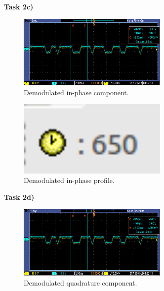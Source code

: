 \documentclass{article}
\begin{document}
\pagebreak
\textbf{Task 2c)}

\begin{figure}[h]
  \begin{center}
    \includegraphics[width=0.65\textwidth]{img/task_2_c_oscilloscope.png}
    \caption{Demodulated in-phase component.}
  \end{center}
\end{figure}

\begin{figure}[h]
  \begin{center}
    \includegraphics[width=0.65\textwidth]{img/task_2_c_profile.png}
    \caption{Demodulated in-phase profile.}
  \end{center}
\end{figure}

\pagebreak
\textbf{Task 2d)}

\begin{figure}[h]
  \begin{center}
    \includegraphics[width=0.65\textwidth]{img/task_2_c_oscilloscope.png}
    \caption{Demodulated quadrature component.}
  \end{center}
\end{figure}
\end{document}
